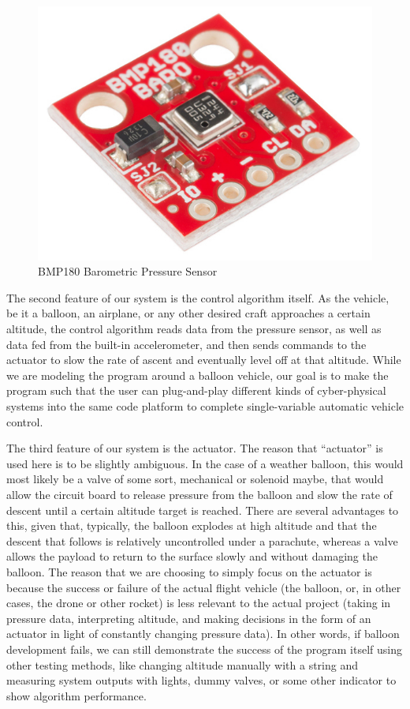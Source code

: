 \documentclass[12pt]{article}
\begin{document}
\begin{figure}[!t]
\centering
\includegraphics[width=3 in]{BMP.jpg}
\caption{BMP180 Barometric Pressure Sensor}
\label{fig:cpx}
\end{figure}

The second feature of our system is the control algorithm itself. As the vehicle, be it a balloon, an airplane, or any other desired craft approaches a certain altitude, the control algorithm reads data from the pressure sensor, as well as data fed from the built-in accelerometer, and then sends commands to the actuator to slow the rate of ascent and eventually level off at that altitude. While we are modeling the program around a balloon vehicle, our goal is to make the program such that the user can plug-and-play different kinds of cyber-physical systems into the same code platform to complete single-variable automatic vehicle control. 

The third feature of our system is the actuator. The reason that “actuator” is used here is to be slightly ambiguous. In the case of a weather balloon, this would most likely be a valve of some sort, mechanical or solenoid maybe, that would allow the circuit board to release pressure from the balloon and slow the rate of descent until a certain altitude target is reached. There are several advantages to this, given that, typically, the balloon explodes at high altitude and that the descent that follows is relatively uncontrolled under a parachute, whereas a valve allows the payload to return to the surface slowly and without damaging the balloon. The reason that we are choosing to simply focus on the actuator is because the success or failure of the actual flight vehicle (the balloon, or, in other cases, the drone or other rocket) is less relevant to the actual project (taking in pressure data, interpreting altitude, and making decisions in the form of an actuator in light of constantly changing pressure data). In other words, if balloon development fails, we can still demonstrate the success of the program itself using other testing methods, like changing altitude manually with a string and measuring system outputs with lights, dummy valves, or some other indicator to show algorithm performance. 
\end{document}
